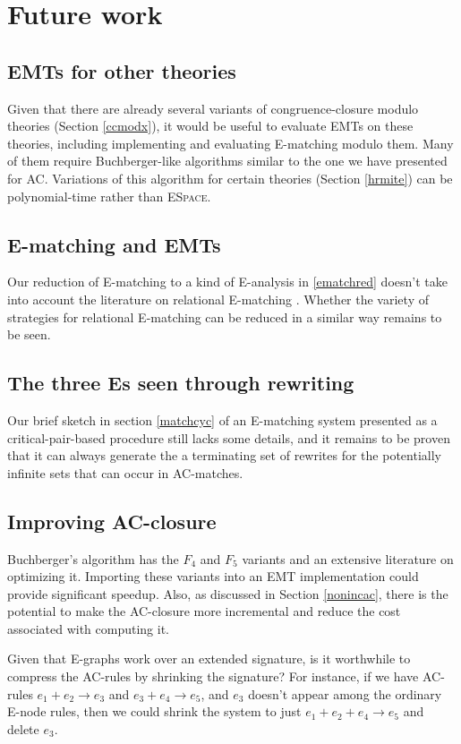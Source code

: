 \documentclass[12pt,a4paper,twoside,openright]{report}
\numberwithin{equation}{chapter}		%
\numberwithin{figure}{chapter}			%
\numberwithin{table}{chapter}			%
\theoremstyle{definition}
\theoremstyle{plain}
\begin{document}
\section{Future work}
\subsection{EMTs for other theories}
Given that there are already several variants of congruence-closure modulo theories (Section \ref{ccmodx}), it would be useful to evaluate EMTs on these theories, including implementing and evaluating E-matching modulo them. Many of them require Buchberger-like algorithms similar to the one we have presented for AC. Variations of this algorithm for certain theories (Section \ref{hrmite}) can be polynomial-time rather than \textsc{ESpace}.

\subsection{E-matching and EMTs} \label{ematchtheories}
Our reduction of E-matching to a kind of E-analysis in \ref{ematchred} doesn't take into account the literature on relational E-matching \cite{zhang_relational_2022}. Whether the variety of strategies for relational E-matching can be reduced in a similar way remains to be seen.

\subsection{The three Es seen through rewriting} \label{acmatch2}
Our brief sketch in section \ref{matchcyc} of an E-matching system presented as a critical-pair-based procedure still lacks some details, and it remains to be proven that it can always generate the a terminating set of rewrites for the potentially infinite sets that can occur in AC-matches.

\subsection{Improving AC-closure}
Buchberger's algorithm has the $F_4$ and $F_5$ variants and an extensive literature on optimizing it. Importing these variants into an EMT implementation could provide significant speedup. Also, as discussed in Section \ref{nonincac}, there is the potential to make the AC-closure more incremental and reduce the cost associated with computing it.

Given that E-graphs work over an extended signature, is it worthwhile to compress the AC-rules by shrinking the signature? For instance, if we have AC-rules $e_1 + e_2 \rightarrow e_3$ and $e_3 + e_4 \rightarrow e_5$, and $e_3$ doesn't appear among the ordinary E-node rules, then we could shrink the system to just $e_1 + e_2 + e_4 \rightarrow e_5$ and delete $e_3$.
\end{document}
